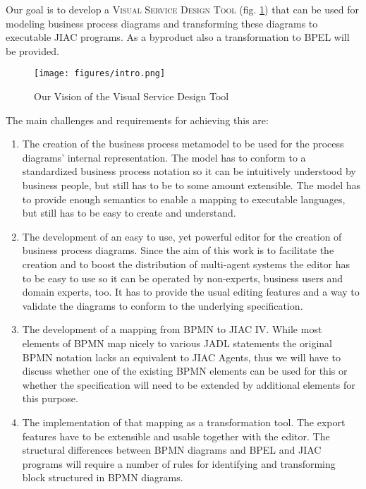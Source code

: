 Our goal is to develop a \textsc{Visual Service Design Tool} (fig. \ref{fig:vsdt}) that can be used for modeling business process diagrams and transforming these diagrams to executable JIAC programs. As a byproduct also a transformation to BPEL will be provided.

\begin{figure}[htp]
	\centering
	\texttt{[image: figures/intro.png]}
	\caption{Our Vision of the Visual Service Design Tool}
	\label{fig:vsdt}
\end{figure}

The main challenges and requirements for achieving this are:
\begin{enumerate}

	\item The creation of the business process metamodel to be used for the process diagrams' internal representation. The model has to conform to a standardized business process notation so it can be intuitively understood by business people, but still has to be to some amount extensible. The model has to provide enough semantics to enable a mapping to executable languages, but still has to be easy to create and understand.
	
	\item The development of an easy to use, yet powerful editor for the creation of business process diagrams. Since the aim of this work is to facilitate the creation and to boost the distribution of multi-agent systems the editor has to be easy to use so it can be operated by non-experts, business users and domain experts, too. It has to provide the usual editing features and a way to validate the diagrams to conform to the underlying specification.
	
	\item The development of a mapping from BPMN to JIAC IV. While most elements of BPMN map nicely to various JADL statements the original BPMN notation lacks an equivalent to JIAC Agents, thus we will have to discuss whether one of the existing BPMN elements can be used for this or whether the specification will need to be extended by additional elements for this purpose.
	
	\item The implementation of that mapping as a transformation tool. The export features have to be extensible and usable together with the editor. The structural differences between BPMN diagrams and BPEL and JIAC programs will require a number of rules for identifying and transforming block structured in BPMN diagrams.

\end{enumerate}


